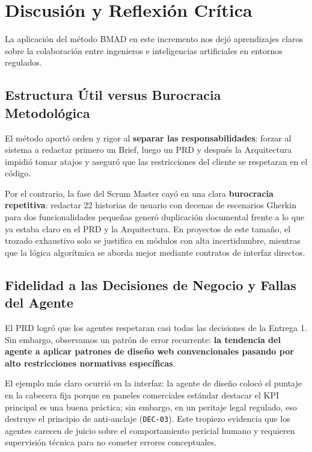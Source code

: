 \documentclass[11pt,letterpaper]{article}
\begin{document}
\newpage

\section{Discusión y Reflexión Crítica}

La aplicación del método BMAD en este incremento nos dejó aprendizajes claros sobre la colaboración entre ingenieros e inteligencias artificiales en entornos regulados.

\subsection{Estructura Útil versus Burocracia Metodológica}
El método aportó orden y rigor al \textbf{separar las responsabilidades}: forzar al sistema a redactar primero un Brief, luego un PRD y después la Arquitectura impidió tomar atajos y aseguró que las restricciones del cliente se respetaran en el código.

Por el contrario, la fase del Scrum Master cayó en una clara \textbf{burocracia repetitiva}: redactar 22 historias de usuario con decenas de escenarios Gherkin para dos funcionalidades pequeñas generó duplicación documental frente a lo que ya estaba claro en el PRD y la Arquitectura. En proyectos de este tamaño, el trozado exhaustivo solo se justifica en módulos con alta incertidumbre, mientras que la lógica algorítmica se aborda mejor mediante contratos de interfaz directos.

\subsection{Fidelidad a las Decisiones de Negocio y Fallas del Agente}
El PRD logró que los agentes respetaran casi todas las decisiones de la Entrega 1. Sin embargo, observamos un patrón de error recurrente: \textbf{la tendencia del agente a aplicar patrones de diseño web convencionales pasando por alto restricciones normativas específicas}.

El ejemplo más claro ocurrió en la interfaz: la agente de diseño colocó el puntaje en la cabecera fija porque en paneles comerciales estándar destacar el KPI principal es una buena práctica; sin embargo, en un peritaje legal regulado, eso destruye el principio de anti-anclaje (\texttt{DEC-03}). Este tropiezo evidencia que los agentes carecen de juicio sobre el comportamiento pericial humano y requieren supervisión técnica para no cometer errores conceptuales.
\end{document}

